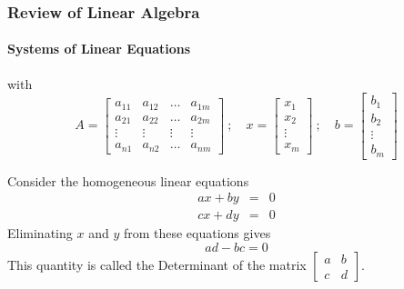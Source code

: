 \begin{frame}
\frametitle{Review of Linear Algebra}
\framesubtitle{Systems of Linear Equations}
with
$$
A = \left[\begin{array}{cccc}
a_{11} &  a_{12} & \dots  & a_{1m} \\
a_{21} &  a_{22} & \dots  & a_{2m} \\
\vdots & \vdots & \vdots & \vdots \\
a_{n1} &  a_{n2} & \dots  & a_{nm}
\end{array}\right]
\ ; \quad
x = \left[\begin{array}{c} x_1 \\ x_2 \\ \vdots \\ x_m \end{array}\right] \ ; \quad
b = \left[\begin{array}{c} b_1 \\ b_2 \\ \vdots \\ b_m \end{array}\right]
$$


Consider the homogeneous linear equations
\begin{eqnarray*}
ax + by &=& 0 \\
cx + dy &=& 0
\end{eqnarray*}
Eliminating $x$ and $y$ from these equations gives
$$
ad-bc = 0
$$
This quantity is called the {\bor Determinant} of the matrix $\left[\begin{array}{cc}
a & b \\ c & d \end{array}\right]$.
\end{frame}
